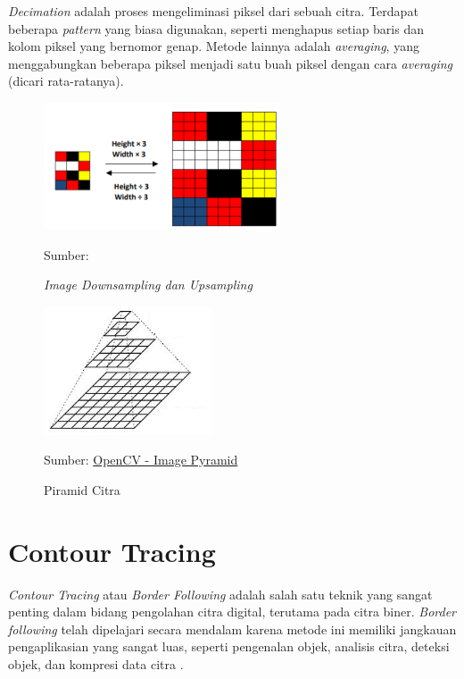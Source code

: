     \textit{Decimation} adalah proses mengeliminasi piksel dari sebuah citra. Terdapat beberapa \textit{pattern} yang biasa digunakan, seperti menghapus setiap baris dan kolom piksel yang bernomor genap. Metode lainnya adalah \textit{averaging}, yang menggabungkan beberapa piksel menjadi satu buah piksel dengan cara \textit{averaging} (dicari rata-ratanya).
    \begin{figure}[H]
    \centering
      \singlespacing
      \includegraphics[width=7cm]{image/upsampling and downsampling.png}
      \caption{\textit{Image Downsampling dan Upsampling}}
      \small{Sumber: \citet{Paul2021}}
      \label{fig:Image Downsampling and Upsampling}
    \end{figure}
    \begin{figure}[H]
    \centering
      \singlespacing
      \includegraphics[width=5cm]{image/Pyramids_Tutorial_Pyramid_Theory.png}
      \caption{Piramid Citra}
      \small{Sumber: \href{https://docs.opencv.org/3.4/d4/d1f/tutorial_pyramids.html}{OpenCV - Image Pyramid}}
      \label{fig:Piramid Citra}
    \end{figure}

  
\section{Contour Tracing}
    \textit{Contour Tracing} atau \textit{Border Following} adalah salah satu teknik yang sangat penting dalam bidang pengolahan citra digital, terutama pada citra biner. \textit{Border following} telah dipelajari secara mendalam karena metode ini memiliki jangkauan pengaplikasian yang sangat luas, seperti pengenalan objek, analisis citra, deteksi objek, dan kompresi data citra \citep{Suzuki1985}.
    

